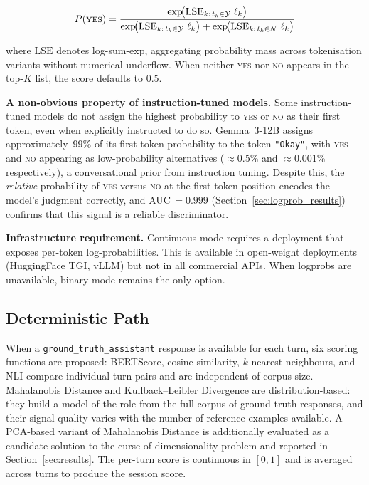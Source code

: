 \documentclass[11pt,a4paper]{article}
\begin{document}
\begin{equation}
  P(\textsc{yes}) = \frac{
    \exp\!\bigl(\mathrm{LSE}_{k:\, t_k \in \mathcal{Y}}\; \ell_k\bigr)
  }{
    \exp\!\bigl(\mathrm{LSE}_{k:\, t_k \in \mathcal{Y}}\; \ell_k\bigr)
    + \exp\!\bigl(\mathrm{LSE}_{k:\, t_k \in \mathcal{N}}\; \ell_k\bigr)
  }
  \label{eq:logprob}
\end{equation}

where $\mathrm{LSE}$ denotes log-sum-exp, aggregating probability mass
across tokenisation variants without numerical underflow. When neither
\textsc{yes} nor \textsc{no} appears in the top-$K$ list, the score
defaults to $0.5$.

\textbf{A non-obvious property of instruction-tuned models.}
Some instruction-tuned models do not assign the highest probability to
\textsc{yes} or \textsc{no} as their first token, even when explicitly
instructed to do so. Gemma~3-12B assigns approximately~99\% of its
first-token probability to the token \texttt{"Okay"}, with \textsc{yes}
and \textsc{no} appearing as low-probability alternatives
($\approx$0.5\% and $\approx$0.001\% respectively), a conversational
prior from instruction tuning. Despite this, the \emph{relative} probability
of \textsc{yes} versus \textsc{no} at the first token position encodes the
model's judgment correctly, and AUC\,$= 0.999$ (Section~\ref{sec:logprob_results})
confirms that this signal is a reliable discriminator.

\textbf{Infrastructure requirement.} Continuous mode requires a deployment
that exposes per-token log-probabilities. This is available in open-weight
deployments (HuggingFace TGI, vLLM) but not in all commercial APIs. When
logprobs are unavailable, binary mode remains the only option.

\subsection{Deterministic Path}
\label{sec:deterministic}

When a \texttt{ground\_truth\_assistant} response is available for each turn,
six scoring functions are proposed: BERTScore, cosine similarity,
$k$-nearest neighbours, and NLI compare individual turn pairs and are
independent of corpus size. Mahalanobis Distance and Kullback--Leibler
Divergence are distribution-based: they build a model of the role from
the full corpus of ground-truth responses, and their signal quality varies
with the number of reference examples available. A PCA-based variant of
Mahalanobis Distance is additionally evaluated as a candidate solution to
the curse-of-dimensionality problem and reported in Section~\ref{sec:results}.
The per-turn score is continuous in $[0, 1]$ and is averaged across turns
to produce the session score.
\end{document}
